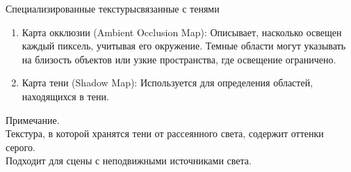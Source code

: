 \documentclass{beamer}
\begin{document}
	\begin{frame}{Специализированные текстуры}{связанные с тенями}
		\begin{enumerate}
			\item Карта окклюзии (Ambient Occlusion Map): Описывает, насколько освещен каждый пиксель, учитывая его окружение. Темные области могут указывать на близость объектов или узкие пространства, где освещение ограничено.
			\item Карта тени (Shadow Map): Используется для определения областей, находящихся в тени. 
		\end{enumerate}
		
		Примечание.
		\\Текстура, в которой хранятся тени от рассеянного света, содержит оттенки серого.
		\\ Подходит для сцены с неподвижными источниками света.
	
	\end{frame}
\end{document}
